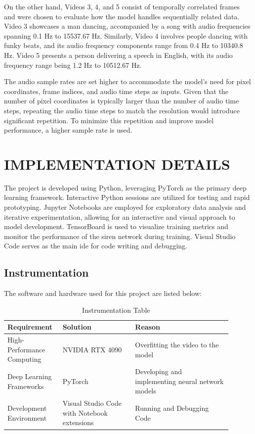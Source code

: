 \documentclass{ioereport}
\begin{document}
On the other hand, Videos 3, 4, and 5 consist of temporally correlated frames and were chosen to evaluate how the model handles sequentially related data. Video 3 showcases a man dancing, accompanied by a song with audio frequencies spanning 0.1 Hz to 15537.67 Hz. Similarly, Video 4 involves people dancing with funky beats, and its audio frequency components range from 0.4 Hz to 10340.8 Hz. Video 5 presents a person delivering a speech in English, with its audio frequency range being 1.2 Hz to 10512.67 Hz.

The audio sample rates are set higher to accommodate the model's need for pixel coordinates, frame indices, and audio time steps as inputs. Given that the number of pixel coordinates is typically larger than the number of audio time steps, repeating the audio time steps to match the resolution would introduce significant repetition. To minimize this repetition and improve model performance, a higher sample rate is used.



\pagebreak

\section{\MakeUppercase{Implementation Details}}
The project is developed using Python, leveraging PyTorch as the primary deep learning framework. Interactive Python sessions are utilized for testing and rapid prototyping. Jupyter Notebooks are employed for exploratory data analysis and iterative experimentation, allowing for an interactive and visual approach to model development. TensorBoard is used to visualize training metrics and monitor the performance of the \gls{siren} network during training. Visual Studio Code serves as the main \gls{ide} for code writing and debugging.

\subsection{Instrumentation}
    The software and hardware used for this project are listed below:
    \begin{table}[H]
        \caption{Instrumentation Table}
        \label{table:instrumentation-table}
        \centering
        \begin{tabular}{|L{0.2\linewidth}|L{0.3\linewidth}|L{0.4\linewidth}|}
            \hline
            \textbf{Requirement} & \textbf{Solution} & \textbf{Reason} \\
            \hline
            High-Performance Computing & NVIDIA RTX 4090 & Overfitting the video to the model \\
            \hline
            Deep Learning Frameworks & PyTorch &
            Developing and implementing neural network models \\
            \hline
            Development Environment & Visual Studio Code with Notebook extensions & Running and Debugging Code\\
            \hline
        \end{tabular}
    \end{table}
    
\end{document}
